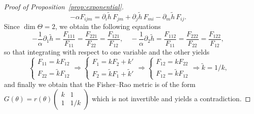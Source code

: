 \documentclass[11pt,reqno]{amsart}
\theoremstyle{definition}
\begin{document}
\begin{proof}[Proof of Proposition~\ref{prop:exponential}]
$$-\alpha F_{ijm}=\partial_i\tilde h\, F_{jm} + \partial_j \tilde h\, F_{mi}-\partial_m \tilde h\, F_{ij}.$$
Since $\dim\Theta=2$, we obtain the following equations
$$-\frac{1}{\alpha}\partial_1\tilde h=\frac{F_{111}}{F_{11}}=\frac{F_{221}}{F_{22}}=\frac{F_{121}}{F_{12}}, \quad -\frac{1}{\alpha}\partial_2\tilde h=\frac{F_{112}}{F_{11}}=\frac{F_{222}}{F_{22}}=\frac{F_{122}}{F_{12}},$$
so that integrating with respect to one variable and the other yields
$$\begin{cases}F_{11}=k F_{12}\\ F_{22}=\tilde kF_{12}\end{cases}\Rightarrow 
\begin{cases}F_1=kF_2+k'\\ F_2=\tilde kF_1+\tilde k'\end{cases}\Rightarrow
\begin{cases}F_{12}=k F_{22}\\ F_{12}=\tilde k F_{12}\end{cases}\Rightarrow \tilde k=1/k,$$
and finally we obtain that the Fisher--Rao metric is of the form $G(\theta)=r(\theta)\left(\begin{matrix} k & 1\\ 1 & 1/k\end{matrix}\right)$ which is not invertible and yields a contradiction.
\end{proof}
\end{document}
